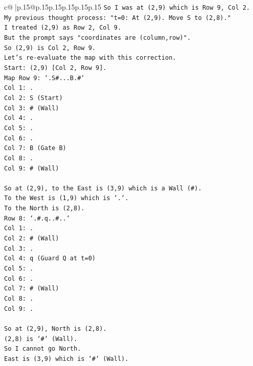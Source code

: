 \documentclass{article}
\begin{document}
{\begin{supertabular}{c@{$\;$}|p{.15\linewidth}@{}p{.15\linewidth}p{.15\linewidth}p{.15\linewidth}p{.15\linewidth}p{.15\linewidth}}
{{{\texttt{So I was at (2,9) which is Row 9, Col 2.} \\
\texttt{My previous thought process: "t=0: At (2,9). Move S to (2,8)."} \\
\texttt{I treated (2,9) as Row 2, Col 9.} \\
\texttt{But the prompt says "coordinates are (column,row)".} \\
\texttt{So (2,9) is Col 2, Row 9.} \\
\texttt{Let's re{-}evaluate the map with this correction.} \\
\texttt{Start: (2,9) {[}Col 2, Row 9{]}.} \\
\texttt{Map Row 9: `.S\#...B.\#`} \\
\texttt{Col 1: .} \\
\texttt{Col 2: S (Start)} \\
\texttt{Col 3: \# (Wall)} \\
\texttt{Col 4: .} \\
\texttt{Col 5: .} \\
\texttt{Col 6: .} \\
\texttt{Col 7: B (Gate B)} \\
\texttt{Col 8: .} \\
\texttt{Col 9: \# (Wall)} \\
\\ 
\texttt{So at (2,9), to the East is (3,9) which is a Wall (\#).} \\
\texttt{To the West is (1,9) which is `.`.} \\
\texttt{To the North is (2,8).} \\
\texttt{Row 8: `.\#.q..\#..`} \\
\texttt{Col 1: .} \\
\texttt{Col 2: \# (Wall)} \\
\texttt{Col 3: .} \\
\texttt{Col 4: q (Guard Q at t=0)} \\
\texttt{Col 5: .} \\
\texttt{Col 6: .} \\
\texttt{Col 7: \# (Wall)} \\
\texttt{Col 8: .} \\
\texttt{Col 9: .} \\
\\ 
\texttt{So at (2,9), North is (2,8).} \\
\texttt{(2,8) is `\#` (Wall).} \\
\texttt{So I cannot go North.} \\
\texttt{East is (3,9) which is `\#` (Wall).} \\
}}}
\end{supertabular}}
\end{document}
